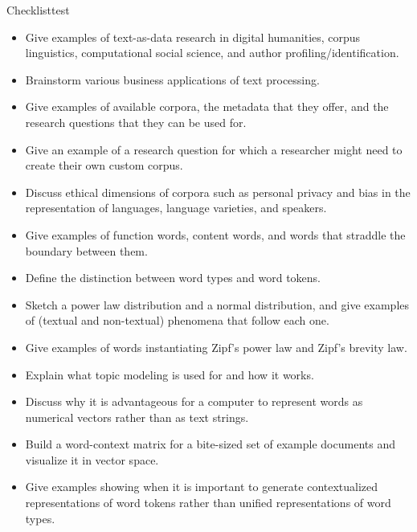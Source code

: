 \begin{tblsfilledsymbol}{Checklist}{test}
    
\begin{itemize}
\item Give examples of text-as-data research in digital humanities,
corpus linguistics, computational social science, and author
profiling/identification.
\item Brainstorm various business applications of text processing.
\item Give examples of available corpora, the metadata that they
offer, and the research questions that they can be used for.
\item Give an example of a research question for which a researcher might need to create their own custom corpus.
\item Discuss ethical dimensions of corpora such as personal privacy
and bias in the representation of languages, language varieties, and
speakers.
\item Give examples of function words, content words, and words that
straddle the boundary between them.
\item Define the distinction between word types and word tokens.
\item Sketch a power law distribution and a normal distribution, and
give examples of (textual and non-textual) phenomena that follow each
one.
\item Give examples of words instantiating Zipf's power law and Zipf's
brevity law.
\item Explain what topic modeling is used for and how it works.
\item Discuss why it is advantageous for a computer to represent words
as numerical vectors rather than as text strings.
\item Build a word-context matrix for a bite-sized set of example
documents and visualize it in vector space.
\item Give examples showing when it is important to generate contextualized representations of word tokens rather than unified representations of word types.
\end{itemize}
\end{tblsfilledsymbol}

